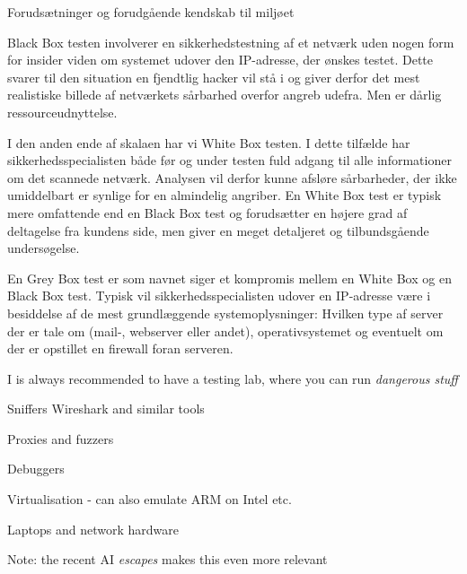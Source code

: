 \documentclass[Screen16to9,17pt]{foils}
\begin{document}

\begin{list2}
\item Forudsætninger og forudgående kendskab til miljøet
\item Black Box testen involverer en sikkerhedstestning af et netværk uden
nogen form for insider viden om systemet udover den IP-adresse, der
ønskes testet. Dette svarer til den situation en fjendtlig hacker vil
stå i og giver derfor det mest realistiske billede af netværkets
sårbarhed overfor angreb udefra. Men er dårlig ressourceudnyttelse.
\item I den anden ende  af skalaen har vi White Box testen. I dette tilfælde
har sikkerhedsspecialisten både før og under testen fuld adgang til
alle informationer om det scannede netværk. Analysen vil derfor kunne
afsløre sårbarheder, der ikke umiddelbart er synlige for en almindelig
angriber. En White Box test er typisk mere omfattende end en Black Box
test og forudsætter en højere grad af deltagelse fra kundens side, men
giver en meget detaljeret og tilbundsgående undersøgelse.

\item En Grey Box test er som navnet siger et kompromis mellem en White Box
og en Black Box test. Typisk vil sikkerhedsspecialisten udover en
IP-adresse være i besiddelse af de mest grundlæggende
systemoplysninger: Hvilken type af server der er tale om (mail-,
webserver eller andet), operativsystemet og eventuelt om der er
opstillet en firewall foran serveren.
\end{list2}




I is always recommended to have a testing lab, where you can run \emph{dangerous
 stuff}
\begin{list2}
\item Sniffers Wireshark and similar tools
\item Proxies and fuzzers
\item Debuggers
\item Virtualisation - can also emulate ARM on Intel etc.
\item Laptops and network hardware
\end{list2}

Note: the recent AI \emph{escapes} makes this even more relevant



\slidenext{}
\end{document}
